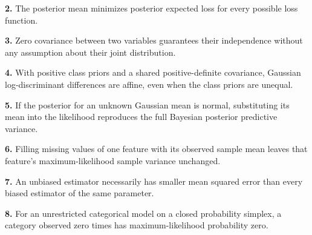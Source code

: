 \documentclass[11pt,a4paper]{article}
\begin{document}
\par\noindent\begin{minipage}{\linewidth}
\textbf{2.} The posterior mean minimizes posterior expected loss for every possible loss function.
\end{minipage}\par\vspace{3mm}
\par\noindent\begin{minipage}{\linewidth}
\textbf{3.} Zero covariance between two variables guarantees their independence without any assumption about their joint distribution.
\end{minipage}\par\vspace{3mm}
\par\noindent\begin{minipage}{\linewidth}
\textbf{4.} With positive class priors and a shared positive-definite covariance, Gaussian log-discriminant differences are affine, even when the class priors are unequal.
\end{minipage}\par\vspace{3mm}
\par\noindent\begin{minipage}{\linewidth}
\textbf{5.} If the posterior for an unknown Gaussian mean is normal, substituting its mean into the likelihood reproduces the full Bayesian posterior predictive variance.
\end{minipage}\par\vspace{3mm}
\par\noindent\begin{minipage}{\linewidth}
\textbf{6.} Filling missing values of one feature with its observed sample mean leaves that feature's maximum-likelihood sample variance unchanged.
\end{minipage}\par\vspace{3mm}
\par\noindent\begin{minipage}{\linewidth}
\textbf{7.} An unbiased estimator necessarily has smaller mean squared error than every biased estimator of the same parameter.
\end{minipage}\par\vspace{3mm}
\par\noindent\begin{minipage}{\linewidth}
\textbf{8.} For an unrestricted categorical model on a closed probability simplex, a category observed zero times has maximum-likelihood probability zero.
\end{minipage}\par\vspace{3mm}
\end{document}
